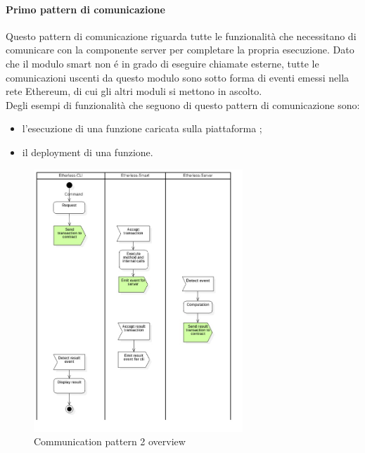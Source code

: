 	\paragraph{Primo pattern di comunicazione}
		Questo pattern di comunicazione riguarda tutte le funzionalità che necessitano di comunicare con la componente server per completare la propria esecuzione. Dato che il modulo smart non é in grado di eseguire chiamate esterne, tutte le comunicazioni uscenti da questo modulo sono sotto forma di eventi emessi nella rete Ethereum, di cui gli altri moduli si mettono in ascolto. \\ Degli esempi di funzionalità che seguono di questo pattern di comunicazione sono:
		\begin{itemize}
			\item l'esecuzione di una funzione caricata sulla piattaforma \NomeProgetto{};
			\item il deployment di una funzione.
		\end{itemize}
		\begin{figure}[H]
			\centering
			\includegraphics[width=0.7\textwidth]{././diagrammi/generali/activity_diag_pattern2.jpg}
			\caption{Communication pattern 2 overview}
		\end{figure}
